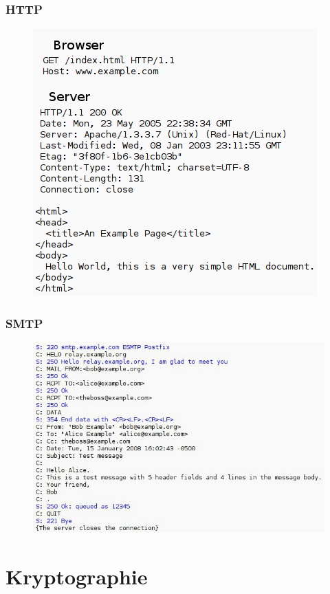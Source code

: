 \documentclass[12pt]{beamer}
\begin{document}
\begin{frame}
  \frametitle{HTTP}
  \begin{figure}
    \includegraphics[height=0.7\textheight]{img/http.png}
  \end{figure}
\end{frame}

\begin{frame}
  \frametitle{SMTP}
  \begin{figure}
    \includegraphics[height=0.7\textheight]{img/smtp.jpg}
  \end{figure}
\end{frame}

\section{Kryptographie}
\end{document}
